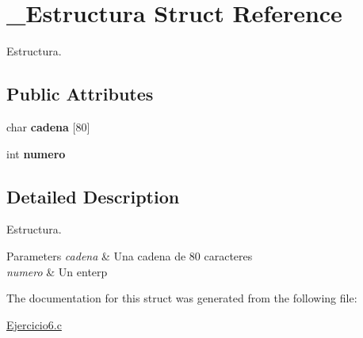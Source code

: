 \hypertarget{struct__Estructura}{}\section{\+\_\+\+Estructura Struct Reference}
\label{struct__Estructura}


Estructura.  


\subsection*{Public Attributes}
\begin{DoxyCompactItemize}
\item 
\mbox{\label{struct__Estructura_a107a5e974e90d51e186c1a4f5360996b}} 
char {\bfseries cadena} \mbox{[}80\mbox{]}
\item 
\mbox{\label{struct__Estructura_a03532d6c329fc7ca3cad390533dd8d1b}} 
int {\bfseries numero}
\end{DoxyCompactItemize}


\subsection{Detailed Description}
Estructura. 


\begin{DoxyParams}{Parameters}
{\em cadena} & Una cadena de 80 caracteres \\
\hline
{\em numero} & Un enterp \\
\hline
\end{DoxyParams}


The documentation for this struct was generated from the following file\+:\begin{DoxyCompactItemize}
\item 
\hyperlink{Ejercicio6_8c}{Ejercicio6.\+c}\end{DoxyCompactItemize}

